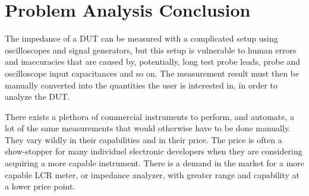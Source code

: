 \section{Problem Analysis Conclusion} \label{sec:probAnalConc}
The impedance of a DUT can be measured with a complicated setup using oscilloscopes and signal generators, but this setup is vulnerable to human errors and inaccuracies that are caused by, potentially, long test probe leads, probe and oscilloscope input capacitances and so on. The measurement result must then be manually converted into the quantities the user is interested in, in order to analyze the DUT.

There exists a plethora of commercial instruments to perform, and automate, a lot of the same measurements that would otherwise have to be done manually. They vary wildly in their capabilities and in their price. The price is often a show-stopper for many individuel electronic developers when they are considering acquiring a more capable instrument. There is a demand in the market for a more capable LCR meter, or impedance analyzer, with greater range and capability at a lower price point.